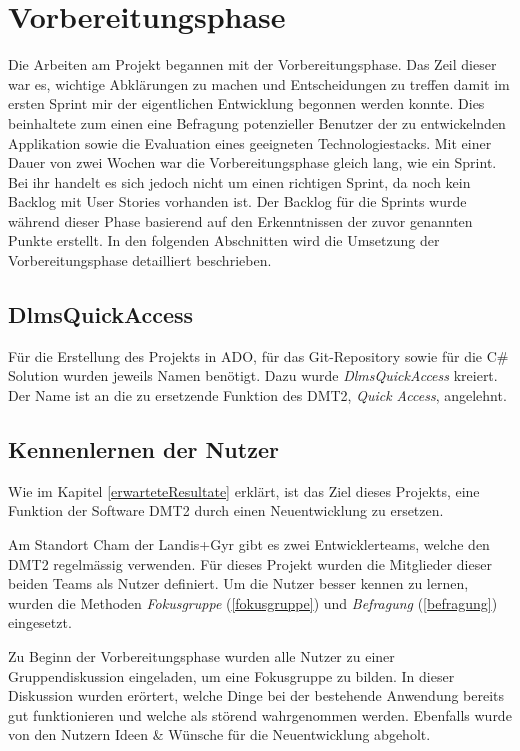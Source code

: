 \section{Vorbereitungsphase}
Die Arbeiten am Projekt begannen mit der Vorbereitungsphase. Das Zeil dieser war es, wichtige Abklärungen zu machen und Entscheidungen zu treffen damit im ersten Sprint mir der eigentlichen Entwicklung begonnen werden konnte.
Dies beinhaltete zum einen eine Befragung potenzieller Benutzer der zu entwickelnden Applikation sowie die Evaluation eines geeigneten Technologiestacks.
Mit einer Dauer von zwei Wochen war die Vorbereitungsphase gleich lang, wie ein Sprint.
Bei ihr handelt es sich jedoch nicht um einen richtigen Sprint, da noch kein Backlog mit User Stories vorhanden ist.
Der Backlog für die Sprints wurde während dieser Phase basierend auf den Erkenntnissen der zuvor genannten Punkte erstellt.
In den folgenden Abschnitten wird die Umsetzung der Vorbereitungsphase detailliert beschrieben.

\subsection{DlmsQuickAccess}
Für die Erstellung des Projekts in \ac{ADO}, für das Git-Repository sowie für die C\# Solution wurden jeweils Namen benötigt.
Dazu wurde \textit{DlmsQuickAccess} kreiert.
Der Name ist an die zu ersetzende Funktion des \ac{DMT2}, \textit{Quick Access}, angelehnt.

\subsection{Kennenlernen der Nutzer}\label{survey}
Wie im Kapitel \ref{erwarteteResultate} erklärt, ist das Ziel dieses Projekts, eine Funktion der Software \ac{DMT2} durch einen Neuentwicklung zu ersetzen.

Am Standort Cham der Landis+Gyr gibt es zwei Entwicklerteams, welche den \ac{DMT2} regelmässig verwenden.
Für dieses Projekt wurden die Mitglieder dieser beiden Teams als Nutzer definiert.
Um die Nutzer besser kennen zu lernen, wurden die Methoden \textit{Fokusgruppe} (\ref{fokusgruppe}) und \textit{Befragung} (\ref{befragung}) eingesetzt.

Zu Beginn der Vorbereitungsphase wurden alle Nutzer zu einer Gruppendiskussion eingeladen, um eine Fokusgruppe zu bilden.
In dieser Diskussion wurden erörtert, welche Dinge bei der bestehende Anwendung bereits gut funktionieren und welche als störend wahrgenommen werden.
Ebenfalls wurde von den Nutzern Ideen \& Wünsche für die Neuentwicklung abgeholt.

